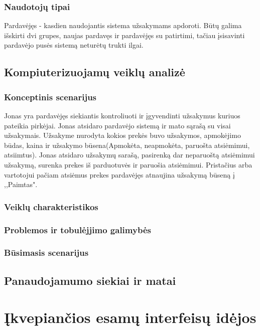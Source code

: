 \documentclass[oneside]{VUMIFPSkursinis}
\begin{document}
		\subsubsection{Naudotojų tipai}
			Pardavėjęs - kasdien naudojantis sistema užsakymams apdoroti. Būtų galima išskirti dvi grupes, naujas pardavęs ir pardavėjęs su patirtimi, tačiau įsisavinti pardavėjo pusės sistemą neturėtų trukti ilgai.
	\subsection{Kompiuterizuojamų veiklų analizė}
		\subsubsection{Konceptinis scenarijus}
			Jonas yra pardavėjęs siekiantis kontroliuoti ir įgyvendinti užsakymus kuriuos pateikia pirkėjai. Jonas atsidaro pardavėjo sistemą ir mato sąrašą su visai užsakymais. Užsakyme nurodyta kokios prekės buvo užsakymos, apmokėjimo būdas, kaina ir užsakymo būsena(Apmokėta, neapmokėta, paruošta atsiėmimui, atsiimtus). Jonas atsidaro užsakymų sarašą, pasirenką dar neparuoštą atsiėmimui užsakymą, surenka prekes iš parduotuvės ir paruošia atsiėmimui. Pristačius arba vartotojui pačiam atsiėmus prekes pardavėjęs atnaujina užsakymą būseną į ,,Paimtas". 
		\subsubsection{Veiklų charakteristikos}
				
		\subsubsection{Problemos ir tobulėjjimo galimybės}
		\subsubsection{Būsimasis scenarijus}
	\subsection{Panaudojamumo siekiai ir matai}

\section{Įkvepiančios esamų interfeisų idėjos}
\end{document}
